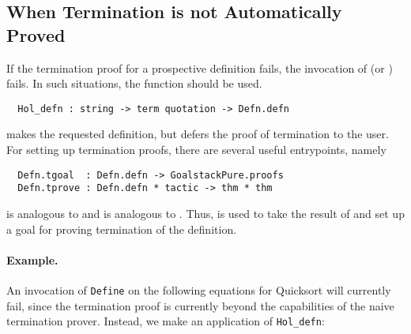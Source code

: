 \subsection{When Termination is not Automatically Proved}

If the termination proof for a prospective definition
fails, the invocation of  (or ) fails. In such
situations, the \ML{} function  should be used.
%

\begin{hol}
\begin{verbatim}
  Hol_defn : string -> term quotation -> Defn.defn
\end{verbatim}
\end{hol}

 makes the requested definition, but defers the proof of
termination to the user. For setting up termination proofs, there are
several useful entrypoints, namely
\begin{hol}
\begin{verbatim}
  Defn.tgoal  : Defn.defn -> GoalstackPure.proofs
  Defn.tprove : Defn.defn * tactic -> thm * thm
\end{verbatim}
\end{hol}
 is analogous to  and  is
analogous to . Thus,  is used to take the
result of  and set up a goal for proving termination
of the definition.

\paragraph{Example.} An invocation of {\small\verb+Define+} on
the following equations for Quicksort will currently fail, since the
termination proof is currently beyond the capabilities of the naive termination
prover. Instead, we make an application of {\small\verb+Hol_defn+}:

